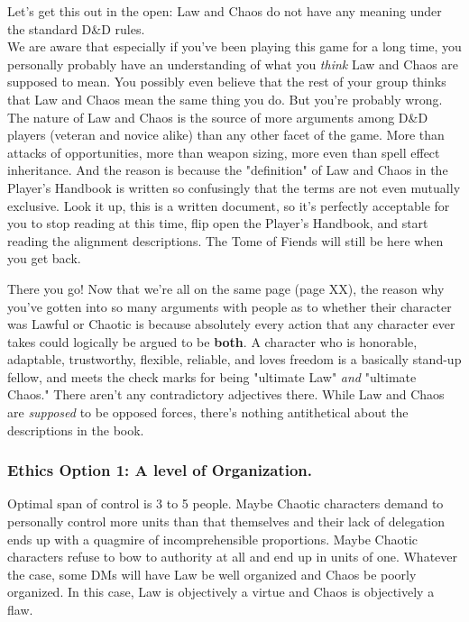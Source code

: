 Let's get this out in the open: Law and Chaos do not have any meaning under the standard D\&D rules.\\

We are aware that especially if you've been playing this game for a long time, you personally probably have an understanding of what you \textit{think} Law and Chaos are supposed to mean. You possibly even believe that the rest of your group thinks that Law and Chaos mean the same thing you do. But you're probably wrong. The nature of Law and Chaos is the source of more arguments among D\&D players (veteran and novice alike) than any other facet of the game. More than attacks of opportunities, more than weapon sizing, more even than spell effect inheritance. And the reason is because the "definition" of Law and Chaos in the Player's Handbook is written so confusingly that the terms are not even mutually exclusive. Look it up, this is a written document, so it's perfectly acceptable for you to stop reading at this time, flip open the Player's Handbook, and start reading the alignment descriptions. The Tome of Fiends will still be here when you get back.

There you go! Now that we're all on the same page (page XX), the reason why you've gotten into so many arguments with people as to whether their character was Lawful or Chaotic is because absolutely every action that any character ever takes could logically be argued to be \textbf{both}. A character who is honorable, adaptable, trustworthy, flexible, reliable, and loves freedom is a basically stand-up fellow, and meets the check marks for being "ultimate Law" \textit{and} "ultimate Chaos." There aren't any contradictory adjectives there. While Law and Chaos are \textit{supposed} to be opposed forces, there's nothing antithetical about the descriptions in the book.


\subsubsection{Ethics Option 1: A level of Organization.}
Optimal span of control is 3 to 5 people. Maybe Chaotic characters demand to personally control more units than that themselves and their lack of delegation ends up with a quagmire of incomprehensible proportions. Maybe Chaotic characters refuse to bow to authority at all and end up in units of one. Whatever the case, some DMs will have Law be well organized and Chaos be poorly organized. In this case, Law is objectively a virtue and Chaos is objectively a flaw.

